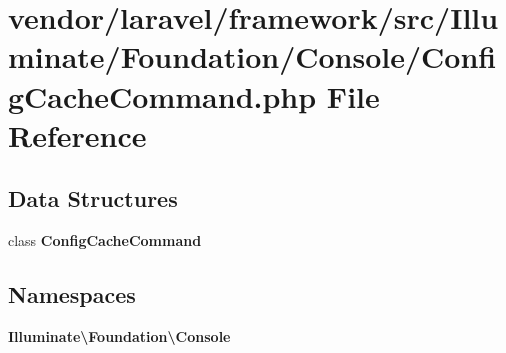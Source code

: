 \section{vendor/laravel/framework/src/\+Illuminate/\+Foundation/\+Console/\+Config\+Cache\+Command.php File Reference}
\label{_config_cache_command_8php}
\subsection*{Data Structures}
\begin{DoxyCompactItemize}
\item 
class {\bf Config\+Cache\+Command}
\end{DoxyCompactItemize}
\subsection*{Namespaces}
\begin{DoxyCompactItemize}
\item 
 {\bf Illuminate\textbackslash{}\+Foundation\textbackslash{}\+Console}
\end{DoxyCompactItemize}

